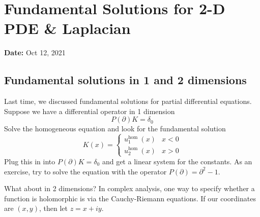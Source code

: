 \newpage
\section{Fundamental Solutions for 2-D PDE \& Laplacian}
\textbf{Date:} Oct 12, 2021
\subsection{Fundamental solutions in 1 and 2 dimensions}

Last time, we discussed fundamental solutions for partial differential equations. Suppose we have a differential operator in 1 dimension
$$
P(\partial) K=\delta_{0}
$$
Solve the homogeneous equation and look for the fundamental solution
$$
K(x)= \begin{cases}u_{1}^{\text {hom }}(x) & x<0 \\ u_{2}^{\text {hom }}(x) & x>0\end{cases}
$$
Plug this in into $P(\partial) K=\delta_{0}$ and get a linear system for the constants. As an exercise, try to solve the equation with the operator $P(\partial)=\partial^{2}-1 $.

What about in 2 dimensions? In complex analysis, one way to specify whether a function is holomorphic is via the Cauchy-Riemann equations. If our coordinates are $(x, y)$, then let $z=x+i y$.

